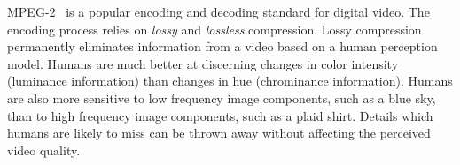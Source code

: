 
MPEG-2~\cite{MPEG2} is a popular encoding and decoding standard for
digital video. %
The encoding process relies on {\it lossy} and {\it lossless}
compression. Lossy compression permanently eliminates information from
a video based on a human perception model. Humans are much better at
discerning changes in color intensity (luminance information) than
changes in hue (chrominance information). Humans are also more
sensitive to low frequency image components, such as a blue sky, than
to high frequency image components, such as a plaid shirt. Details
which humans are likely to miss can be thrown away without affecting
the perceived video quality.





